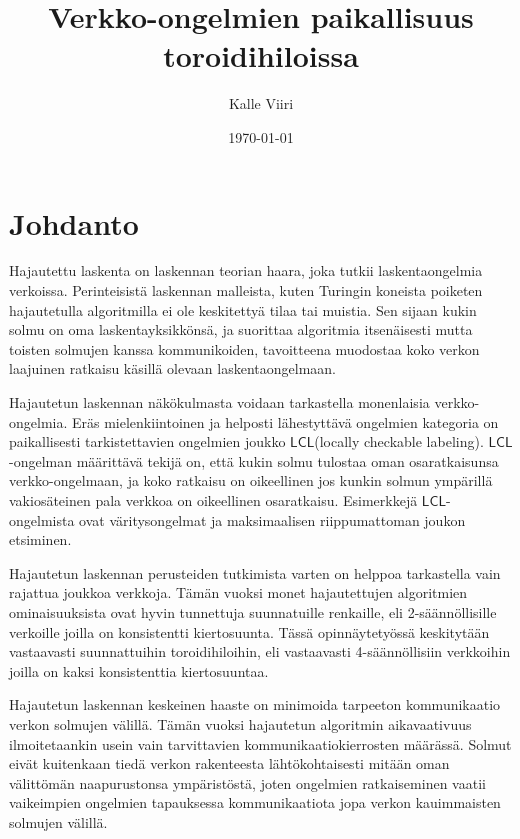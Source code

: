 \documentclass[12pt,finnish]{tktltiki2}
\title{Verkko-ongelmien paikallisuus toroidihiloissa}
\author{Kalle Viiri}
\date{\today}
\theoremstyle{definition}
\theoremstyle{remark}
\newcommand*{\lcl}{\ensuremath{\mathsf{LCL}}}
\begin{document}

\frontmatter      %

\maketitle        %
\makeabstract     %

\tableofcontents  %


\mainmatter       %

\section{Johdanto}
Hajautettu laskenta on laskennan teorian haara, joka tutkii laskentaongelmia verkoissa. Perinteisistä laskennan malleista, kuten Turingin koneista poiketen hajautetulla algoritmilla ei ole keskitettyä tilaa tai muistia. Sen sijaan kukin solmu on oma laskentayksikkönsä, ja suorittaa algoritmia itsenäisesti mutta toisten solmujen kanssa kommunikoiden, tavoitteena muodostaa koko verkon laajuinen ratkaisu käsillä olevaan laskentaongelmaan.

Hajautetun laskennan näkökulmasta voidaan tarkastella monenlaisia verkko-ongelmia. Eräs mielenkiintoinen ja helposti lähestyttävä ongelmien kategoria on paikallisesti tarkistettavien ongelmien joukko \lcl (locally checkable labeling). \lcl -ongelman määrittävä tekijä on, että kukin solmu tulostaa oman osaratkaisunsa verkko-ongelmaan, ja koko ratkaisu on oikeellinen jos kunkin solmun ympärillä vakiosäteinen pala verkkoa on oikeellinen osaratkaisu. Esimerkkejä \lcl -ongelmista ovat väritysongelmat ja maksimaalisen riippumattoman joukon etsiminen.

Hajautetun laskennan perusteiden tutkimista varten on helppoa tarkastella vain rajattua joukkoa verkkoja. Tämän vuoksi monet hajautettujen algoritmien ominaisuuksista ovat hyvin tunnettuja suunnatuille renkaille, eli 2-säännöllisille verkoille joilla on konsistentti kiertosuunta. Tässä opinnäytetyössä keskitytään vastaavasti suunnattuihin toroidihiloihin, eli vastaavasti 4-säännöllisiin verkkoihin joilla on kaksi konsistenttia kiertosuuntaa.

Hajautetun laskennan keskeinen haaste on minimoida tarpeeton kommunikaatio verkon solmujen välillä. Tämän vuoksi hajautetun algoritmin aikavaativuus ilmoitetaankin usein vain tarvittavien kommunikaatiokierrosten määrässä. Solmut eivät kuitenkaan tiedä verkon rakenteesta lähtökohtaisesti mitään oman välittömän naapurustonsa ympäristöstä, joten ongelmien ratkaiseminen vaatii vaikeimpien ongelmien tapauksessa kommunikaatiota jopa verkon kauimmaisten solmujen välillä.
\end{document}
